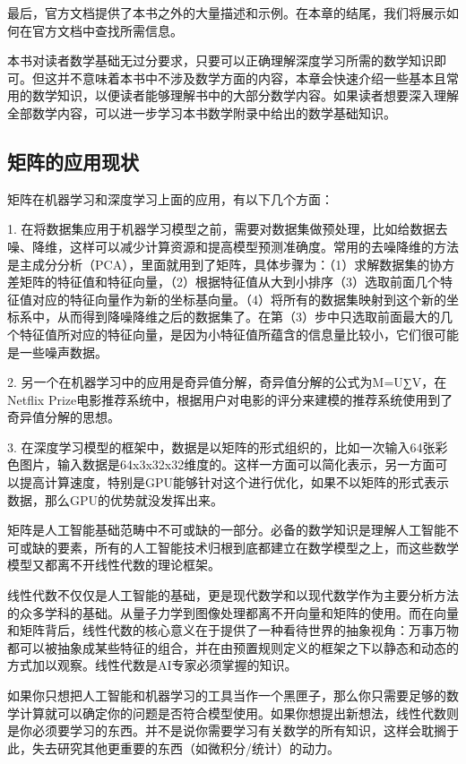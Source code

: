 最后，官方文档提供了本书之外的大量描述和示例。在本章的结尾，我们将展示如何在官方文档中查找所需信息。

本书对读者数学基础无过分要求，只要可以正确理解深度学习所需的数学知识即可。但这并不意味着本书中不涉及数学方面的内容，本章会快速介绍一些基本且常用的数学知识，以便读者能够理解书中的大部分数学内容。如果读者想要深入理解全部数学内容，可以进一步学习本书数学附录中给出的数学基础知识。

\subsection{矩阵的应用现状}

矩阵在机器学习和深度学习上面的应用，有以下几个方面：

1. 在将数据集应用于机器学习模型之前，需要对数据集做预处理，比如给数据去噪、降维，这样可以减少计算资源和提高模型预测准确度。常用的去噪降维的方法是主成分分析（PCA），里面就用到了矩阵，具体步骤为：（1）求解数据集的协方差矩阵的特征值和特征向量，（2）根据特征值从大到小排序（3）选取前面几个特征值对应的特征向量作为新的坐标基向量。（4）将所有的数据集映射到这个新的坐标系中，从而得到降噪降维之后的数据集了。在第（3）步中只选取前面最大的几个特征值所对应的特征向量，是因为小特征值所蕴含的信息量比较小，它们很可能是一些噪声数据。

2. 另一个在机器学习中的应用是奇异值分解，奇异值分解的公式为M=U∑V，在Netflix Prize电影推荐系统中，根据用户对电影的评分来建模的推荐系统使用到了奇异值分解的思想。

3. 在深度学习模型的框架中，数据是以矩阵的形式组织的，比如一次输入64张彩色图片，输入数据是64x3x32x32维度的。这样一方面可以简化表示，另一方面可以提高计算速度，特别是GPU能够针对这个进行优化，如果不以矩阵的形式表示数据，那么GPU的优势就没发挥出来。

矩阵是人工智能基础范畴中不可或缺的一部分。必备的数学知识是理解人工智能不可或缺的要素，所有的人工智能技术归根到底都建立在数学模型之上，而这些数学模型又都离不开线性代数的理论框架。

线性代数不仅仅是人工智能的基础，更是现代数学和以现代数学作为主要分析方法的众多学科的基础。从量子力学到图像处理都离不开向量和矩阵的使用。而在向量和矩阵背后，线性代数的核心意义在于提供了一种看待世界的抽象视角：万事万物都可以被抽象成某些特征的组合，并在由预置规则定义的框架之下以静态和动态的方式加以观察。线性代数是AI专家必须掌握的知识。

如果你只想把人工智能和机器学习的工具当作一个黑匣子，那么你只需要足够的数学计算就可以确定你的问题是否符合模型使用。如果你想提出新想法，线性代数则是你必须要学习的东西。并不是说你需要学习有关数学的所有知识，这样会耽搁于此，失去研究其他更重要的东西（如微积分/统计）的动力。

